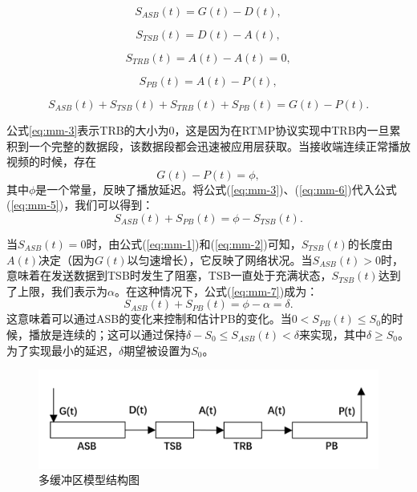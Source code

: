 \begin{equation}
\label{eq:mm-1}
S_{ASB}(t)=G(t)-D(t),
\end{equation}

\begin{equation}
\label{eq:mm-2}
S_{TSB}(t)=D(t)-A(t),
\end{equation}

\begin{equation}
\label{eq:mm-3}
S_{TRB}(t)=A(t)-A(t)=0,
\end{equation}

\begin{equation}
\label{eq:mm-4}
S_{PB}(t) =A(t)-P(t),
\end{equation}

\begin{equation}
\label{eq:mm-5}
S_{ASB}(t)+S_{TSB}(t)+S_{TRB}(t)+S_{PB}(t)=G(t)-P(t).
\end{equation}

公式\ref{eq:mm-3}表示TRB的大小为0，这是因为在RTMP协议实现中TRB内一旦累积到一个完整的数据段，该数据段都会迅速被应用层获取。当接收端连续正常播放视频的时候，存在
\begin{equation}
\label{eq:mm-6}
G(t)-P(t)=\phi,
\end{equation}
其中$\phi$是一个常量，反映了播放延迟。将公式(\ref{eq:mm-3})、(\ref{eq:mm-6})代入公式(\ref{eq:mm-5})，我们可以得到：
\begin{equation}
\label{eq:mm-7}
S_{ASB}(t)+S_{PB}(t)=\phi-S_{TSB}(t).
\end{equation}

当$S_{ASB}(t)=0$时，由公式(\ref{eq:mm-1})和(\ref{eq:mm-2})可知，$S_{TSB}(t)$的长度由$A(t)$决定（因为$G(t)$以匀速增长），它反映了网络状况。当$S_{ASB}(t)>0$时，意味着在发送数据到TSB时发生了阻塞，TSB一直处于充满状态，$S_{TSB}(t)$达到了上限，我们表示为$\alpha$。在这种情况下，公式(\ref{eq:mm-7})成为：
\begin{equation}
\label{eq:mm-8}
S_{ASB}(t)+S_{PB}(t)=\phi-\alpha=\delta.
\end{equation}
这意味着可以通过ASB的变化来控制和估计PB的变化。当$0 < S_{PB}(t) \le S_0$的时候，播放是连续的；这可以通过保持$\delta - S_0 \le S_{ASB}(t) < \delta$来实现，其中$\delta \ge S_0$。为了实现最小的延迟，$\delta$期望被设置为$S_0$。

\begin{figure}[t]
	\centering
	\includegraphics[width = 0.9\linewidth]{figures/multi-buffer.png}
	\caption{多缓冲区模型结构图\label{fig:multi-buffer}}
\end{figure}

